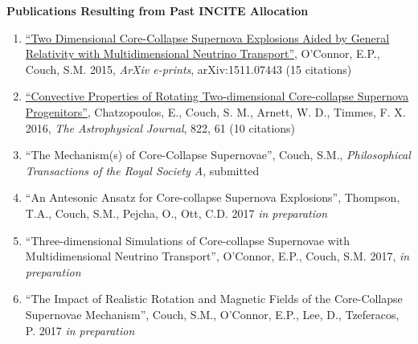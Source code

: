 \documentclass[11pt,letterpaper,english]{article}
\begin{document}
\setlength{\parindent}{0in} %


\pagestyle{fancy} \lhead{\doctitle}  \renewcommand{%
\headrulewidth}{0.0pt}

\begin{center}
\bf \large {Publications Resulting from Past INCITE Allocation} \\
\end{center}
\vspace{-.25in}

\begin{enumerate}

\item \href{https://ui.adsabs.harvard.edu/#abs/2015arXiv151107443O/abstract}{``Two Dimensional Core-Collapse Supernova Explosions Aided by General Relativity with Multidimensional Neutrino Transport''}, O'Connor, E.P., Couch, S.M. 2015, {\itshape ArXiv e-prints}, arXiv:1511.07443 (15 citations)

\item \href{https://ui.adsabs.harvard.edu/#abs/2016ApJ...822...61C/abstract}{``Convective Properties of Rotating Two-dimensional Core-collapse Supernova Progenitors''}, Chatzopoulos, E., Couch, S. M., Arnett, W. D., Timmes, F. X. 2016, {\itshape The Astrophysical Journal}, 822, 61 (10 citations)

\item ``The Mechanism(s) of Core-Collapse Supernovae'', Couch, S.M., {\it Philosophical Transactions of the Royal Society A}, submitted

\item ``An Antesonic Ansatz for Core-collapse Supernova Explosions'', Thompson, T.A., Couch, S.M., Pejcha, O., Ott, C.D. 2017 {\it in preparation}

\item ``Three-dimensional Simulations of Core-collapse Supernovae with Multidimensional Neutrino Transport'', O'Connor, E.P., Couch, S.M. 2017, {\it in preparation}

\item ``The Impact of Realistic Rotation and Magnetic Fields of the Core-Collapse Supernovae Mechanism'', Couch, S.M., O'Connor, E.P., Lee, D., Tzeferacos, P. 2017 {\it in preparation}

\end{enumerate}
\end{document}
